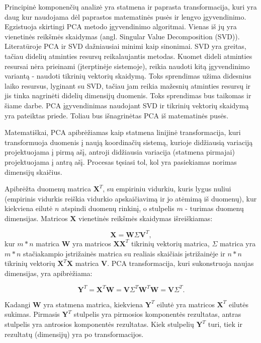 \documentclass[]{vgtuef}
\begin{document}
Principinė komponenčių analizė \cite{citeulike:2695782} yra statmena ir paprasta transformacija, kuri yra daug kur naudojama dėl paprastos matematinės pusės ir lengvo įgyvendinimo. Egzistuoja skirtingi PCA metodo įgyvendinimo algoritmai. Vienas iš jų yra vienetinės reikšmės skaidymas (angl. Singular Value Decomposition (SVD)). Literatūroje PCA ir SVD dažniausiai minimi kaip sinonimai. SVD yra greitas, tačiau didelių atminties resursų reikalaujantis metodas. Kuomet dideli atminties resursai nėra prieinami (įterptinėje sistemoje), reikia naudoti kitą įgyvendinimo variantą - naudoti tikrinių vektorių skaidymą. Toks sprendimas užima didesnius laiko resursus, lyginant su SVD, tačiau jam reikia mažesnių atminties resursų ir jis tinka nagrinėti didelių dimensijų duomenis. Toks sprendimas bus taikomas ir šiame darbe. PCA įgyvendinimas naudojant SVD ir tikrinių vektorių skaidymą yra pateiktas priede. Toliau bus išnagrinėtas PCA iš matematinės pusės.

Matematiškai, PCA apibrėžiamas kaip statmena linijinė transformacija, kuri transformuoja duomenis į naują koordinačių sistemą, kurioje didžiausią variaciją projektuojama į pirmą ašį, antroji didžiausia variacija (statmena pirmajai) projektuojama į antrą ašį. Procesas tęsiasi tol, kol yra pasiekiamas norimas dimensijų skaičius.

Apibrėžta duomenų matrica $\textbf{X}^T$, su empiriniu vidurkiu, kuris lygus nuliui (empirinis vidurkis reiškia vidurkio apskaičiavimą ir jo atėmimą iš duomenų), kur kiekviena eilutė $n$ atspindi duomenų rinkinį, o stulpelis $m$ - turimas duomenų dimensijas. Matricos $\textbf{X}$ vienetinės reikšmės skaidymas išreiškiamas:

\begin{equation}
  \mathbf{X} = \mathbf{W} \Sigma \mathbf{V}^T,
\end{equation}
kur $m*n$ matrica $\mathbf{W}$ yra matricos $\textbf{XX}^T$ tikrinių vektorių matrica, $\Sigma$ matrica yra $m*n$ stačiakampio įstrižainės matrica su realiais skaičiais įstrižainėje ir $n*n$ tikrinių vektorių $\mathbf{X}^T\mathbf{X}$ matrica $\mathbf{V}$. PCA transformacija, kuri sukonstruoja naujas dimensijas, yra apibrėžiama:

\begin{equation}
  \mathbf{Y}^T = \mathbf{X}^T \mathbf{W} = \mathbf{V} \Sigma^T
  \mathbf{W}^T \mathbf{W} = \mathbf{V} \Sigma^T .
\end{equation}

Kadangi $\textbf{W}$ yra statmena matrica, kiekviena $\textbf{Y}^T$ eilutė yra matricos $\textbf{X}^T$ eilutės sukimas. Pirmasis $\textbf{Y}^T$ stulpelis yra pirmosios komponentės rezultatas, antras stulpelis yra antrosios komponentės rezultatas. Kiek stulpelių $\textbf{Y}^T$ turi, tiek ir rezultatų (dimensijų) yra po transformacijos.
\end{document}
